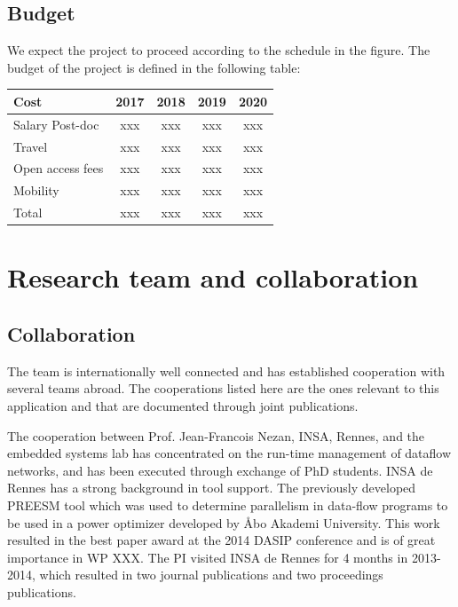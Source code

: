 \documentclass{article}
\begin{document}
\subsection{Budget}
We expect the project to proceed according to the schedule in the figure.
The budget of the project is defined in the following table:
\begin{table}[h]
\begin{center}
\begin{tabular}{ | l | c | c |c |c |}
\hline
{Cost} & {2017} & {2018} & {2019} & {2020} \\ \hline
{Salary Post-doc} & xxx & xxx & xxx & xxx \\ \hline
{Travel} & xxx & xxx & xxx & xxx  \\ \hline
{Open access fees} & xxx & xxx & xxx & xxx  \\ \hline
{Mobility} & xxx & xxx & xxx & xxx  \\ \hline
{Total} & xxx & xxx & xxx & xxx  \\ \hline
\end{tabular}
\label{tab:strconf}
\end{center}

\end{table}

\section{Research team and collaboration}

\subsection{Collaboration}
The team is internationally well connected and has established cooperation with several teams abroad. 
The cooperations listed here are the ones relevant to this application and that are documented through joint publications.

The cooperation between Prof. Jean-Francois Nezan, INSA, Rennes, and the embedded systems lab has concentrated on the run-time management of dataflow networks, 
and has been executed through exchange of PhD students.
INSA de Rennes has a strong background in tool support. 
The previously developed PREESM tool which was used to determine parallelism in data-flow programs to be used in a power optimizer developed by \AA{}bo Akademi University.
This work resulted in the best paper award at the 2014 DASIP conference and is of great importance in WP XXX.
The PI visited INSA de Rennes for 4 months in 2013-2014, which resulted in two journal publications and two proceedings publications.
\end{document}
